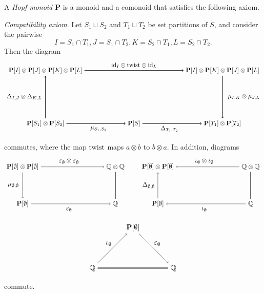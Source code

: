 \documentclass[12pt]{amsart}  %
\theoremstyle{definition}
\theoremstyle{remark}
\numberwithin{equation}{section}
\newcommand{\bbQ}{\mathbb{Q}}
\newcommand{\id}{\mathrm{id}}
\newcommand{\bP}{{\mathbf{P}}}
\newcommand\svw[1]{{\color{black}{#1}}}
\begin{document}
A \emph{Hopf monoid} $\bP$ is a monoid and a comonoid that satisfies the following axiom. 

\emph{Compatibility axiom}. Let $S_1\sqcup S_2$ and $T_1\sqcup T_2$ be set partitions of $S$, and consider the pairwise \svw{intersections} 
$$I=S_1\cap T_1, J=S_1\cap T_2, K=S_2\cap T_1, L=S_2\cap T_2.$$  Then the diagram 
$$
\begin{tikzpicture} 
\node(a) at (0,0){$\bP[I]\otimes \bP[J]\otimes \bP[K]\otimes \bP[L]$};
\node(b) at (10,0){$\bP[I]\otimes \bP[K]\otimes \bP[J]\otimes \bP[L]$};
\node(c) at (0,-3){$\bP[S_1]\otimes \bP[S_2]$};
\node(d) at (5,-3){$\bP[S]$};
\node(e) at (10,-3){$\bP[T_1]\otimes \bP[T_2]$};

\draw[->,thick](a)--(b);
\node at (5,0.3){$\id_I\otimes {\rm twist} \otimes \id_L$};
\draw[->,thick](b)--(e);
\node at (11.2,-1.5){$\mu_{I,K}\otimes \mu_{J,L}$};
\draw[->,thick](c)--(a);
\node at (-1.2,-1.5){$\Delta_{I,J}\otimes \Delta_{K,L}$};
\node at (3,-3.3){$\mu_{S_1,S_2}$};
\draw[->,thick](c)--(d);
\node at (7,-3.3){$\Delta_{T_1,T_2}$};
\draw[->,thick](d)--(e);

\end{tikzpicture} 
$$
commutes, where the map ${\rm twist}$ maps $a\otimes b$ to $b\otimes a$. In addition, \svw{the} diagrams
$$
\begin{tikzpicture} 
\node(a) at (0,0){$\bP[\emptyset]\otimes \bP[\emptyset]$};
\node(b) at (5,0){$\bbQ\otimes \bbQ$};
\node(c) at (0,-2){$\bP[\emptyset]$};
\node(d) at (5,-2){$\bbQ$};
\draw[->] (a)--(b);
\node at (2.5,0.3){$\varepsilon_\emptyset\otimes \varepsilon_\emptyset$};
\draw[->] (c)--(d);
\node at (2.5,-2.3){$\varepsilon_\emptyset$};
\draw[->] (a)--(c);
\node at (-0.5,-1){$\mu_{\emptyset,\emptyset}$};
\draw[double] (b)--(d);
\node at (4.5,-1){};
\end{tikzpicture} 
\quad \quad 
\begin{tikzpicture} 
\node(a) at (0,0){$\bP[\emptyset]\otimes \bP[\emptyset]$};
\node(b) at (5,0){$\bbQ\otimes \bbQ$};
\node(c) at (0,-2){$\bP[\emptyset]$};
\node(d) at (5,-2){$\bbQ$};
\draw[->] (b)--(a);
\node at (2.5,0.3){$\iota_\emptyset\otimes \iota_\emptyset$};
\draw[->] (d)--(c);
\node at (2.5,-2.3){$\iota_\emptyset$};
\draw[->] (c)--(a);
\node at (-0.5,-1){$\Delta_{\emptyset,\emptyset}$};
\draw[double] (d)--(b);
\node at (4.5,-1){};
\end{tikzpicture} 
$$
$$
\begin{tikzpicture}
\node(a) at (0,0){$\bP[\emptyset]$};
\node(b) at (-2,-2){$\bbQ$};
\node(c) at (2,-2){$\bbQ$};

\draw[->](b)--(a);
\node at (-1.2,-0.8){$\iota_{\emptyset}$};
\draw[->](a)--(c);
\node at (1.2,-0.8){$\varepsilon_{\emptyset}$};
\draw[double](b)--(c);
\end{tikzpicture} 
$$
commute.
\end{document}
